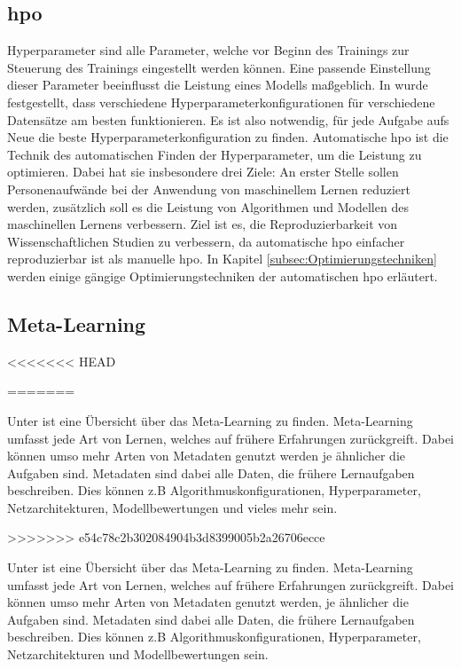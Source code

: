	\subsection{\acl{hpo}}
	\label{subsec:HyperparameterOptimierung}	
	Hyperparameter sind alle Parameter, welche vor Beginn des Trainings zur Steuerung des Trainings eingestellt werden können. Eine passende Einstellung dieser Parameter beeinflusst die Leistung eines Modells maßgeblich. In \cite{Kohavi.1995} wurde festgestellt, dass verschiedene Hyperparameterkonfigurationen für verschiedene Datensätze am besten funktionieren. Es ist also notwendig, für jede Aufgabe aufs Neue die beste Hyperparameterkonfiguration zu finden.      Automatische \ac{hpo} ist die Technik des automatischen Finden der Hyperparameter, um die Leistung zu optimieren. Dabei hat sie insbesondere drei Ziele: An erster Stelle sollen Personenaufwände bei der Anwendung von maschinellem Lernen reduziert werden, zusätzlich soll es die Leistung von Algorithmen und Modellen des maschinellen Lernens verbessern. Ziel ist es, die Reproduzierbarkeit von Wissenschaftlichen Studien zu verbessern, da automatische \ac{hpo} einfacher reproduzierbar ist als manuelle \ac{hpo}. In Kapitel \ref{subsec:Optimierungstechniken} werden einige gängige Optimierungstechniken der automatischen \ac{hpo} erläutert.  
	\cite{Feurer.2019}		
		
	\subsection{Meta-Learning}
	\label{subsec:MetaLearning}
<<<<<<< HEAD

=======

	Unter \cite{JoaquinVanschoren.2018} ist eine Übersicht über das Meta-Learning zu finden. Meta-Learning umfasst jede Art von Lernen, welches auf frühere Erfahrungen zurückgreift. Dabei können umso mehr Arten von Metadaten genutzt werden je ähnlicher die Aufgaben sind. Metadaten sind dabei alle Daten, die frühere Lernaufgaben beschreiben. Dies können z.B Algorithmuskonfigurationen, Hyperparameter, Netzarchitekturen, Modellbewertungen und vieles mehr sein.

>>>>>>> e54c78c2b302084904b3d8399005b2a26706ecce

	Unter \cite{JoaquinVanschoren.2018} ist eine Übersicht über das Meta-Learning zu finden. Meta-Learning umfasst jede Art von Lernen, welches auf frühere Erfahrungen zurückgreift. Dabei können umso mehr Arten von Metadaten genutzt werden, je ähnlicher die Aufgaben sind. Metadaten sind dabei alle Daten, die frühere Lernaufgaben beschreiben. Dies können z.B Algorithmuskonfigurationen, Hyperparameter, Netzarchitekturen und Modellbewertungen sein.
	
